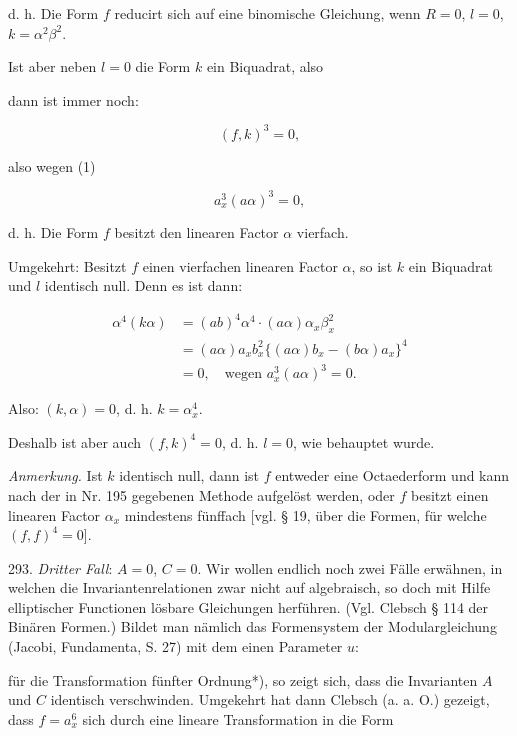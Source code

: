 d. h. \glqq Die Form $f$ reducirt sich auf eine binomische Gleichung, wenn $R=0$, $l=0$, $k=\alpha^2\beta^2$.\grqq{}

Ist aber neben $l=0$ die Form $k$ ein Biquadrat, also


dann ist immer noch:

\[
(f, k)^3 = 0,
\]

also wegen (1)

\[
a_x^3(a\alpha)^3 = 0,
\]

d. h. \glqq Die Form $f$ besitzt den linearen Factor $\alpha$ vierfach.\grqq{}

Umgekehrt: Besitzt $f$ einen vierfachen linearen Factor $\alpha$, so ist $k$ ein Biquadrat und $l$ identisch null. Denn es ist dann:



\[
\begin{aligned}
\alpha^4(k\alpha) &= (ab)^4\alpha^4\cdot(a\alpha)\alpha_x\beta_x^2\\
&= (a\alpha)a_xb_x^2\{(a\alpha)b_x - (b\alpha)a_x\}^4\\
&= 0, \quad \text{wegen } a_x^3(a\alpha)^3 = 0.
\end{aligned}
\]

Also: $(k, \alpha) = 0$, d. h. $k = \alpha_x^4$.

Deshalb ist aber auch $(f, k)^4 = 0$, d. h. $l = 0$, wie behauptet wurde.

\textit{Anmerkung.} Ist $k$ identisch null, dann ist $f$ entweder eine Octaederform und kann nach der in Nr. 195 gegebenen Methode aufgelöst werden, oder $f$ besitzt einen linearen Factor $\alpha_x$ mindestens fünffach [vgl. § 19, über die Formen, für welche $(f,f)^4=0$].

293. \textit{Dritter Fall}: $A=0$, $C=0$. Wir wollen endlich noch zwei Fälle erwähnen, in welchen die Invariantenrelationen zwar nicht auf algebraisch, so doch mit Hilfe elliptischer Functionen lösbare Gleichungen herführen. (Vgl. Clebsch § 114 der \glqq Binären Formen\grqq{}.) Bildet man nämlich das Formensystem der Modulargleichung (Jacobi, \glqq Fundamenta\grqq{}, S. 27) mit dem einen Parameter $u$:


für die Transformation fünfter Ordnung*), so zeigt sich, dass die Invarianten $A$ und $C$ identisch verschwinden. Umgekehrt hat dann Clebsch (a. a. O.) gezeigt, dass $f = a_x^6$ sich durch eine lineare Transformation in die Form

